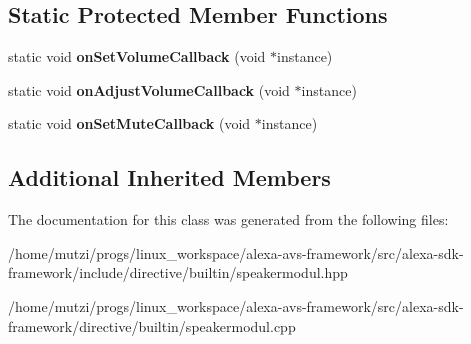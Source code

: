 \subsection*{Static Protected Member Functions}
\begin{DoxyCompactItemize}
\item 
\mbox{\label{classdirective_1_1SpeakerModul_a56caa1fd9631efe10cbd26ab993f29d0}} 
static void {\bfseries on\+Set\+Volume\+Callback} (void $\ast$instance)
\item 
\mbox{\label{classdirective_1_1SpeakerModul_a784fa3c9f739bc9b5195ea9c6dd352fc}} 
static void {\bfseries on\+Adjust\+Volume\+Callback} (void $\ast$instance)
\item 
\mbox{\label{classdirective_1_1SpeakerModul_ad971cb13739908ce8422e7f554a31790}} 
static void {\bfseries on\+Set\+Mute\+Callback} (void $\ast$instance)
\end{DoxyCompactItemize}
\subsection*{Additional Inherited Members}


The documentation for this class was generated from the following files\+:\begin{DoxyCompactItemize}
\item 
/home/mutzi/progs/linux\+\_\+workspace/alexa-\/avs-\/framework/src/alexa-\/sdk-\/framework/include/directive/builtin/speakermodul.\+hpp\item 
/home/mutzi/progs/linux\+\_\+workspace/alexa-\/avs-\/framework/src/alexa-\/sdk-\/framework/directive/builtin/speakermodul.\+cpp\end{DoxyCompactItemize}
